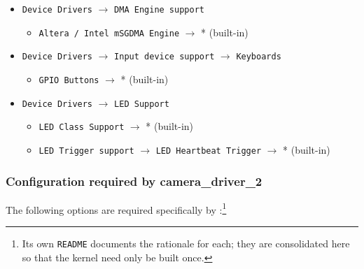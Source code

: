 \begin{itemize}
    \item \texttt{Device Drivers} $\rightarrow$ \texttt{DMA Engine support}
    \begin{itemize}
        \item \texttt{Altera / Intel mSGDMA Engine} $\rightarrow$ * (built-in)
    \end{itemize}
    \item \texttt{Device Drivers} $\rightarrow$ \texttt{Input device support} $\rightarrow$ \texttt{Keyboards}
    \begin{itemize}
        \item \texttt{GPIO Buttons} $\rightarrow$ * (built-in)
    \end{itemize}
    \item \texttt{Device Drivers} $\rightarrow$ \texttt{LED Support}
    \begin{itemize}
        \item \texttt{LED Class Support} $\rightarrow$ * (built-in)
        \item \texttt{LED Trigger support} $\rightarrow$ \texttt{LED Heartbeat Trigger} $\rightarrow$ * (built-in)
    \end{itemize}
\end{itemize}
\subsubsection{Configuration required by camera\_driver\_2}
The following options are required specifically by :\footnote{Its own \texttt{README} documents the rationale for each; they are consolidated here so that the kernel need only be built once.}

